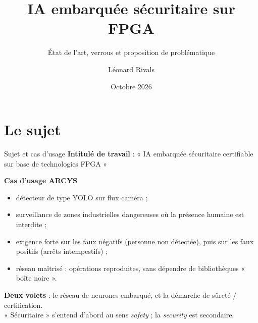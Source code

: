 \documentclass[aspectratio=169,11pt]{beamer}
\title{IA embarquée sécuritaire sur FPGA}
\subtitle{État de l'art, verrous et proposition de problématique}
\author{Léonard Rivals}
\institute{Point ARCYS -- ISAE-SUPAERO}
\date{Octobre 2026}
\begin{document}
\maketitle

\section{Le sujet}

\begin{frame}{Sujet et cas d'usage}
  \textbf{Intitulé de travail} : « IA embarquée sécuritaire certifiable sur base de
  technologies FPGA »

  \vspace{0.3em}
  \textbf{Cas d'usage ARCYS}
  \begin{itemize}
    \item détecteur de type YOLO sur flux caméra ;
    \item surveillance de zones industrielles dangereuses où la présence humaine est interdite ;
    \item exigence forte sur les \alert{faux négatifs} (personne non détectée), puis sur
          les faux positifs (arrêts intempestifs) ;
    \item réseau \alert{maîtrisé} : opérations reproduites, sans dépendre de bibliothèques
          « boîte noire ».
  \end{itemize}

  \vspace{0.2em}
  \textbf{Deux volets} : le réseau de neurones embarqué, et la démarche de sûreté /
  certification.\\
  {\small « Sécuritaire » s'entend d'abord au sens \emph{safety} ; la \emph{security} est secondaire.}
\end{frame}
\end{document}
